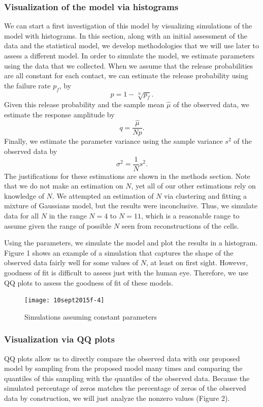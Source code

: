 \documentclass{article}
\begin{document}
\subsubsection{Visualization of the model via histograms}
We can start a first investigation of this model by visualizing simulations of the model with histograms. In this section, along with an initial assessment of the data and the statistical model, we develop methodologies that we will use later to assess a different model. In order to simulate the model, we estimate parameters using the data that we collected. When we assume that the release probabilities are all constant for each contact, we can estimate the release probability using the failure rate $p_f$, by
\[
  p = 1 - \sqrt[N]{p_f}.
\]
Given this release probability and the sample mean $\hat{\mu}$ of the observed data, we estimate the response amplitude by
\[
  q = \frac{\hat{\mu}}{Np}.
\]
Finally, we estimate the parameter variance using the sample variance $s^2$ of the observed data by
\[
  \sigma^2 = \frac{1}{N}s^2.
\]
The justifications for these estimations are shown in the methods section. Note that we do not make an estimation on $N$, yet all of our other estimations rely on knowledge of $N$. We attempted an estimation of $N$ via clustering and fitting a mixture of Gaussians model, but the results were inconclusive. Thus, we simulate data for all $N$ in the range $N = 4$ to $N = 11$, which is a reasonable range to assume given the range of possible $N$ seen from reconstructions of the cells.

Using the parameters, we simulate the model and plot the results in a histogram. Figure 1 shows an example of a simulation that captures the shape of the observed data fairly well for some values of $N$, at least on first sight. However, goodness of fit is difficult to assess just with the human eye. Therefore, we use QQ plots to assess the goodness of fit of these models.
\begin{figure}[h]
  \centering
  \caption{Simulations assuming constant parameters}
  \texttt{[image: 10sept2015f-4]}
\end{figure}

\subsubsection{Visualization via QQ plots}
QQ plots allow us to directly compare the observed data with our proposed model by sampling from the proposed model many times and comparing the quantiles of this sampling with the quantiles of the observed data. Because the simulated percentage of zeros matches the percentage of zeros of the observed data by construction, we will just analyze the nonzero values (Figure 2).
\end{document}

